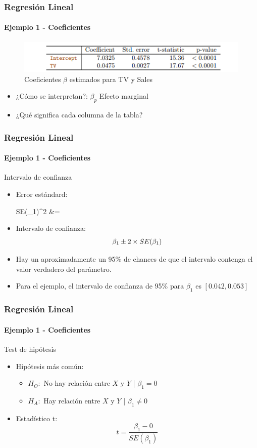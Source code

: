\documentclass{beamer}
\begin{document}
\begin{frame}
\frametitle{Regresión Lineal}
\framesubtitle{Ejemplo 1 - Coeficientes}
	\begin{figure}[h]
		\includegraphics[width=1.\linewidth, height=0.2\textheight]{./img/table01}
		\caption{Coeficientes $\beta$ estimados para TV y Sales \cite{hastie02}}
		\end{figure}
	\begin{itemize}
		\item ¿Cómo se interpretan?: $\beta_{p}$ Efecto marginal
		\item ¿Qué significa cada columna de la tabla?
	\end{itemize}	
\end{frame}

\begin{frame}
\frametitle{Regresión Lineal}
\framesubtitle{Ejemplo 1 - Coeficientes}
Intervalo de confianza
	\begin{itemize}
		\item Error estándard:
			 \begin{flalign}
				 SE(\beta_{1})^2 &=  
			 \end{flalign}
		\item Intervalo de confianza:
			\begin{equation}
				\large \beta_{1} \pm 2 \times SE(\beta_{1})
			\end{equation}
		\item Hay un aproximadamente un 95\% de chances de que el intervalo contenga el valor verdadero del parámetro.
		\item Para el ejemplo, el intervalo de confianza de 95\% para $\beta_{1}$ es $[0.042, 0.053]$
	\end{itemize}	
\end{frame}

\begin{frame}
\frametitle{Regresión Lineal}
\framesubtitle{Ejemplo 1 - Coeficientes}
Test de hipótesis
\begin{itemize}
	\item Hipótesis más común:
	\begin{itemize}
		\item $H_{O}:$ No hay relación entre $X$ y $Y$ | $\beta_{1} = 0$ 
		\item $H_{A}:$ Hay relación entre $X$ y $Y$ | $\beta_{1} \neq 0$
	\end{itemize}
	\item Estadístico t:
		\begin{equation}
			t = \frac{\beta_{1} - 0}{SE(\beta_{1})}
		\end{equation}
\end{itemize}	
\end{frame}
\end{document}
